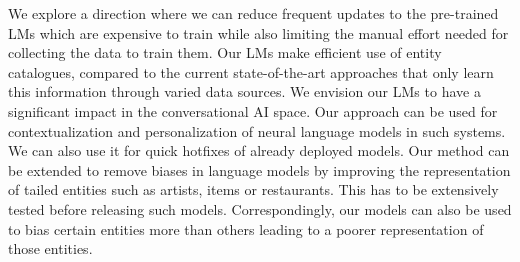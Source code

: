 \documentclass{article}
\begin{document}
We explore a direction where we can reduce frequent updates to the pre-trained LMs which are expensive to train while also limiting the manual effort needed for collecting the data to train them. Our LMs make efficient use of entity catalogues, compared to the current state-of-the-art approaches that only learn this information through varied data sources. We envision our LMs to have a significant impact in the conversational AI space. Our approach can be used for contextualization and personalization of neural language models in such systems. We can also use it for quick hotfixes of already deployed models. Our method can be extended to remove biases in language models by improving the representation of tailed entities such as artists, items or restaurants. This has to be extensively tested before releasing such models. Correspondingly, our models can also be used to bias certain entities more than others leading to a poorer representation of those entities. 




\end{document}
